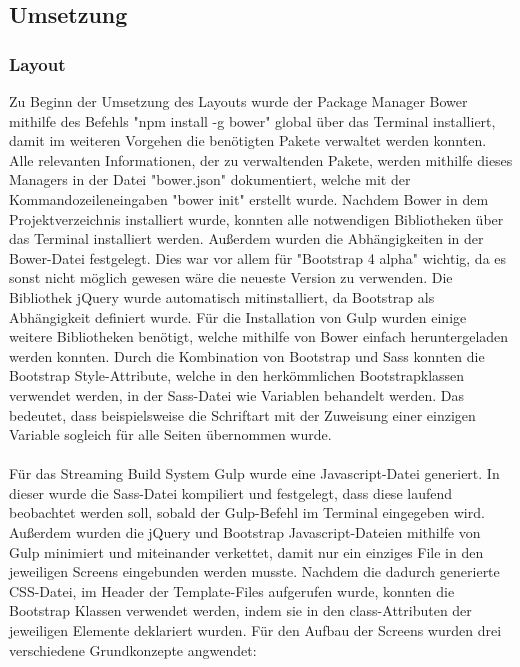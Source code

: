   \subsection{Umsetzung}

    \subsubsection{Layout}

Zu Beginn der Umsetzung des Layouts wurde der Package Manager Bower mithilfe des Befehls "npm install -g bower" global über das Terminal installiert, damit im weiteren Vorgehen die benötigten Pakete verwaltet werden konnten. Alle relevanten Informationen, der zu verwaltenden Pakete, werden mithilfe dieses Managers in der Datei "bower.json" dokumentiert, welche mit der Kommandozeileneingaben "bower init" erstellt wurde.
Nachdem Bower in dem Projektverzeichnis installiert wurde, konnten alle notwendigen Bibliotheken über das Terminal installiert werden. Außerdem wurden die Abhängigkeiten in der Bower-Datei festgelegt. Dies war vor allem für "Bootstrap 4 alpha" wichtig, da es sonst nicht möglich gewesen wäre die neueste Version zu verwenden. Die Bibliothek jQuery wurde automatisch mitinstalliert, da Bootstrap als Abhängigkeit definiert wurde. Für die Installation von Gulp wurden einige weitere Bibliotheken benötigt, welche mithilfe von Bower einfach heruntergeladen werden konnten.
Durch die Kombination von Bootstrap und Sass konnten die Bootstrap Style-Attribute, welche in den herkömmlichen Bootstrapklassen verwendet werden, in der Sass-Datei wie Variablen behandelt werden. Das bedeutet, dass beispielsweise die Schriftart mit der Zuweisung einer einzigen Variable sogleich für alle Seiten übernommen wurde.
\\ \\
Für das Streaming Build System Gulp wurde eine Javascript-Datei generiert. In dieser wurde die Sass-Datei kompiliert und festgelegt, dass diese laufend beobachtet werden soll, sobald der Gulp-Befehl im Terminal eingegeben wird. Außerdem wurden die jQuery und Bootstrap Javascript-Dateien mithilfe von Gulp minimiert und miteinander verkettet, damit nur ein einziges File in den jeweiligen Screens eingebunden werden musste.
Nachdem die dadurch generierte CSS-Datei, im Header der Template-Files aufgerufen wurde, konnten die Bootstrap Klassen verwendet werden, indem sie in den class-Attributen der jeweiligen Elemente deklariert wurden. 
Für den Aufbau der Screens wurden drei verschiedene Grundkonzepte angwendet:
